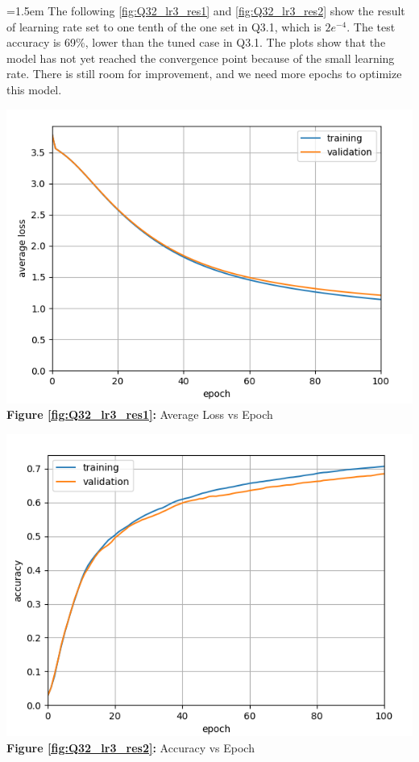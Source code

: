 \documentclass{article}
\begin{document}
	\hangindent=1.5em \hspace{1.5em}The following \autoref{fig:Q32_lr3_res1} and \autoref{fig:Q32_lr3_res2} show the result of learning rate set to one tenth of the one set in Q3.1, which is $2e^{-4}$. The test accuracy is 69\%, lower than the tuned case in Q3.1. The plots show that the model has not yet reached the convergence point because of the small learning rate. There is still room for improvement, and we need more epochs to optimize this model.
	\newline		
	
	\begin{minipage}{0.48\linewidth}
	\centering
	\includegraphics[width=\linewidth]{./Q32_lr3_res1.png}
	\textbf{Figure \ref{fig:Q32_lr3_res1}:} Average Loss vs Epoch %
	\label{fig:Q32_lr3_res1}         %
	\end{minipage}
\hfill
	\begin{minipage}{0.48\linewidth}
	\centering
	\includegraphics[width=\linewidth]{./Q32_lr3_res2.png}
	\textbf{Figure \ref{fig:Q32_lr3_res2}:} Accuracy vs Epoch  %
	\label{fig:Q32_lr3_res2}         %
	\end{minipage}	
	
\end{document}
